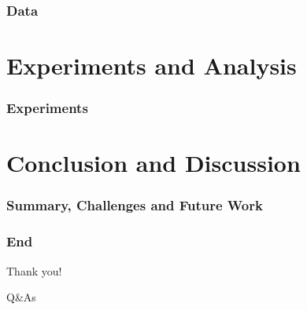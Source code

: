 \documentclass[unknownkeysallowed]{beamer}
\begin{document}
\begin{frame}
\frametitle{Data}


\end{frame}


\section{Experiments and Analysis}

\begin{frame}
\frametitle{Experiments}


\end{frame}










\section{Conclusion and Discussion}

\begin{frame}
\frametitle{Summary, Challenges and Future Work}



\end{frame}





\begin{frame}
\frametitle{ End }

\center Thank you! \newline 

\center Q\&As


\end{frame}
\end{document}
